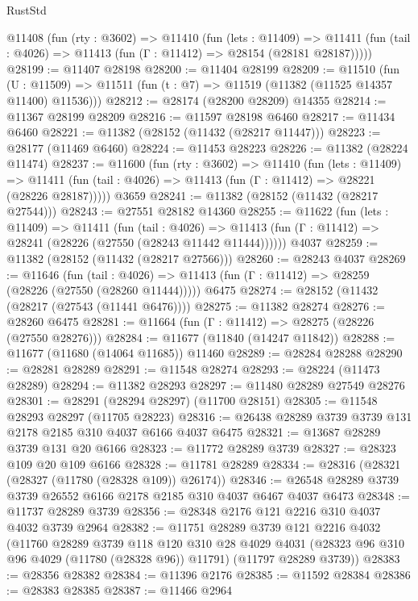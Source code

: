 \begin{lexlean}{RustStd}
\begin{coremodule}
  @11408
    (fun (rty : @3602) =>
    @11410
      (fun (lets : @11409) =>
      @11411 (fun (tail : @4026) => @11413 (fun (Γ : @11412) => @28154 (@28181 @28187)))))
@28199 := @11407 @28198
@28200 := @11404 @28199
@28209 := @11510
    (fun (U : @11509) => @11511 (fun (t : @7) => @11519 (@11382 (@11525 @14357 @11400) @11536)))
@28212 := @28174 (@28200 @28209) @14355
@28214 := @11367 @28199 @28209
@28216 := @11597 @28198 @6460
@28217 := @11434 @6460
@28221 := @11382 (@28152 (@11432 (@28217 @11447)))
@28223 := @28177 (@11469 @6460)
@28224 := @11453 @28223
@28226 := @11382 (@28224 @11474)
@28237 := @11600
    (fun (rty : @3602) =>
    @11410
      (fun (lets : @11409) =>
      @11411 (fun (tail : @4026) => @11413 (fun (Γ : @11412) => @28221 (@28226 @28187)))))
    @3659
@28241 := @11382 (@28152 (@11432 (@28217 @27544)))
@28243 := @27551 @28182 @14360
@28255 := @11622
    (fun (lets : @11409) =>
    @11411
      (fun (tail : @4026) =>
      @11413 (fun (Γ : @11412) => @28241 (@28226 (@27550 (@28243 @11442 @11444))))))
    @4037
@28259 := @11382 (@28152 (@11432 (@28217 @27566)))
@28260 := @28243 @4037
@28269 := @11646
    (fun (tail : @4026) => @11413 (fun (Γ : @11412) => @28259 (@28226 (@27550 (@28260 @11444)))))
    @6475
@28274 := @28152 (@11432 (@28217 (@27543 (@11441 @6476))))
@28275 := @11382 @28274
@28276 := @28260 @6475
@28281 := @11664 (fun (Γ : @11412) => @28275 (@28226 (@27550 @28276)))
@28284 := @11677 (@11840 (@14247 @11842))
@28288 := @11677 (@11680 (@14064 @11685)) @11460
@28289 := @28284 @28288
@28290 := @28281 @28289
@28291 := @11548 @28274
@28293 := @28224 (@11473 @28289)
@28294 := @11382 @28293
@28297 := @11480 @28289 @27549 @28276
@28301 := @28291 (@28294 @28297) (@11700 @28151)
@28305 := @11548 @28293 @28297 (@11705 @28223)
@28316 := @26438 @28289 @3739 @3739 @131 @2178 @2185 @310 @4037 @6166 @4037 @6475
@28321 := @13687 @28289 @3739 @131 @20 @6166
@28323 := @11772 @28289 @3739
@28327 := @28323 @109 @20 @109 @6166
@28328 := @11781 @28289
@28334 := @28316 (@28321 (@28327 (@11780 (@28328 @109)) @26174))
@28346 := @26548 @28289 @3739 @3739 @26552 @6166 @2178 @2185 @310 @4037 @6467 @4037 @6473
@28348 := @11737 @28289 @3739
@28356 := @28348 @2176 @121 @2216 @310 @4037 @4032 @3739 @2964
@28382 := @11751
    @28289
    @3739
    @121
    @2216
    @4032
    (@11760
      @28289
      @3739
      @118
      @120
      @310
      @28
      @4029
      @4031
      (@28323 @96 @310 @96 @4029 (@11780 (@28328 @96)) @11791)
      (@11797 @28289 @3739))
@28383 := @28356 @28382
@28384 := @11396 @2176
@28385 := @11592 @28384
@28386 := @28383 @28385
@28387 := @11466 @2964

\end{coremodule}
\end{lexlean}
